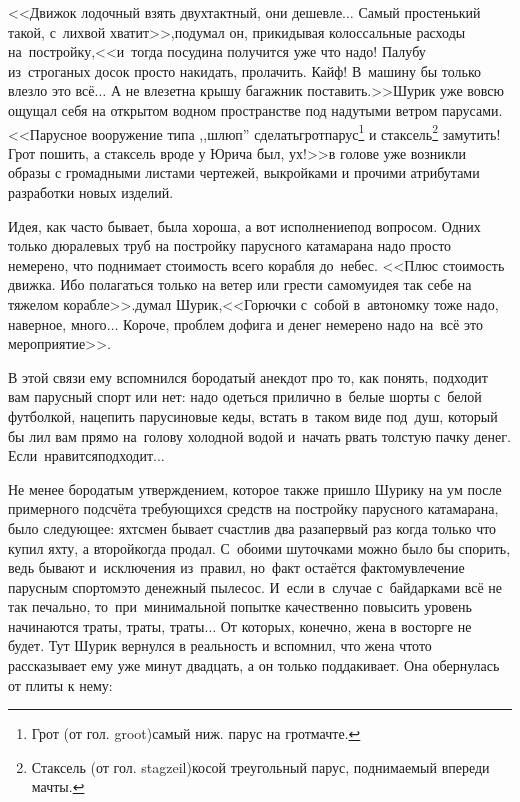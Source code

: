 {<<Движок лодочный взять двухтактный, они дешевле$\ldots$ Самый простенький такой, с~лихвой хватит>>,\mdash подумал он, прикидывая колоссальные расходы на~постройку,\mdash <<и~тогда посудина получится уже что надо! Палубу из~строганых досок просто накидать, пролачить. Кайф! В~машину бы только влезло это всё$\ldots$ А не влезет\mdash на крышу багажник поставить.>>\mdash Шурик уже вовсю ощущал себя на открытом водном пространстве под надутыми ветром парусами. <<Парусное вооружение типа ,,шлюп'' сделать\mdash грот\sdash парус\footnote{Грот (от гол. groot)\mdash самый ниж. парус на грот\sdash мачте\cite{МорскойСправочник}.} и стаксель\footnote{Стаксель (от гол. stagzeil)\mdash косой треугольный парус, поднимаемый впереди мачты\cite{МорскойСправочник}.} замутить! Грот пошить, а стаксель вроде у Юрича был, ух!>>\mdash в голове уже возникли образы с громадными листами чертежей, выкройками и прочими атрибутами разработки новых изделий.

Идея, как часто бывает, была хороша, а вот исполнение\mdash под вопросом. Одних только дюралевых труб на постройку парусного катамарана надо просто немерено, что поднимает стоимость всего корабля до~небес. <<Плюс стоимость движка. Ибо полагаться только на ветер или грести самому\mdash идея так себе на тяжелом корабле>>.\mdash думал Шурик,\mdash <<Горючки с~собой в~автономку тоже надо, наверное, много$\ldots$ Короче, проблем дофига и денег немерено надо на~всё это мероприятие>>. 

В этой связи ему вспомнился бородатый анекдот про то, как понять, подходит вам парусный спорт или нет: надо одеться прилично в~белые шорты с~белой футболкой, нацепить парусиновые кеды, встать в~таком виде под~душ, который бы лил вам прямо на~голову холодной водой и~начать рвать толстую пачку денег. Если~нравится\mdash подходит$\ldots$

Не менее бородатым утверждением, которое также пришло Шурику на ум после примерного подсчёта требующихся средств на постройку парусного катамарана, было следующее: яхтсмен бывает счастлив два раза\mdash первый раз когда только что купил яхту, а второй\mdash когда продал. С~обоими шуточками можно было бы спорить, ведь бывают и~исключения из~правил, но~факт остаётся фактом\mdash увлечение парусным спортом\mdash это денежный пылесос. И~если в~случае с~байдарками всё не так печально, то~при~минимальной попытке качественно повысить уровень начинаются траты, траты, траты$\ldots$ От которых, конечно, жена в восторге не будет. Тут Шурик вернулся в реальность и вспомнил, что жена что\sdash то рассказывает ему уже минут двадцать, а он только поддакивает. Она обернулась от плиты к нему:

}
